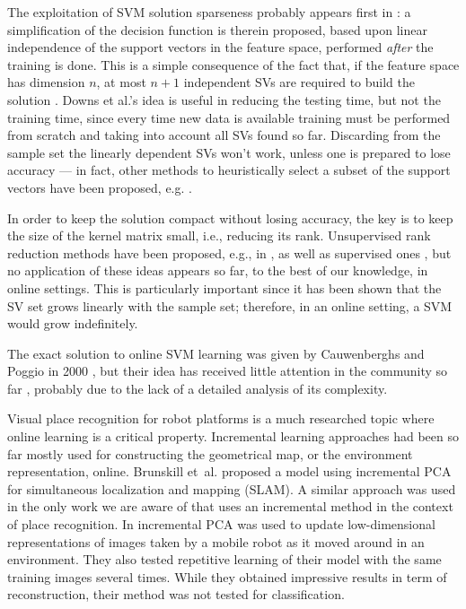 The exploitation of SVM solution sparseness probably appears first in
\cite{DownsGM01}: a simplification of the decision function is therein
proposed, based upon linear independence of the support vectors in the
feature space, performed \emph{after} the training is done. This is a
simple consequence of the fact that, if the feature space has
dimension $n$, at most $n+1$ independent SVs are required to build the
solution \cite{PontilV98}. Downs et al.'s idea is useful in reducing
the testing time, but not the training time, since every time new data
is available training must be performed from scratch and taking into
account all SVs found so far. Discarding from the sample set the
linearly dependent SVs won't work, unless one is prepared to lose
accuracy --- in fact, other methods to heuristically select a subset
of the support vectors have been proposed,
e.g. \cite{LeeM01,schoel06,KeerthiCDC06}.

In order to keep the solution compact without losing accuracy, the key
is to keep the size of the kernel matrix small, i.e., reducing its
rank. Unsupervised rank reduction methods have been proposed, e.g., in
\cite{KeerthiCDC06}, as well as supervised ones
\cite{Baudat03,BachJordan2005}, but no application of these ideas
appears so far, to the best of our knowledge, in online settings. This
is particularly important since it has been shown \cite{Steinwart03}
that the SV set grows linearly with the sample set; therefore, in an
online setting, a SVM would grow indefinitely.

The exact solution to online SVM learning was given by Cauwenberghs
and Poggio in 2000 \cite{CauwenberghsP00}, but their idea has received
little attention in the community so far \cite{Laskov2006}, probably
due to the lack of a detailed analysis of its complexity.

Visual place recognition for robot platforms is a
much researched topic where online learning is a critical property.
Incremental learning approaches had been so far mostly used for constructing
the geometrical map, or the environment representation, online.
Brunskill et~al. \cite{emma:irca05} proposed a model using incremental PCA
for simultaneous localization and mapping (SLAM). A similar approach was used
in the only work we are aware of that uses an incremental method in the
context of place recognition. In \cite{ljubjiana:icra02} incremental PCA was
used to update low-dimensional representations of images taken by a mobile
robot as it moved around in an environment. They also tested repetitive
learning of their model with the same training images several times.
While they obtained impressive results in term of reconstruction, their
method was not tested for classification.
